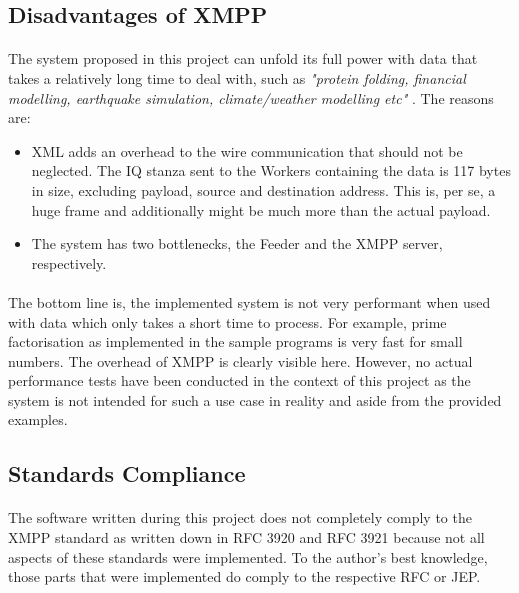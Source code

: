 \subsection{Disadvantages of XMPP}
\paragraph{}
The system proposed in this project can unfold its full power with data that takes a relatively long time to deal with, such as \textit{"protein folding, financial modelling, earthquake simulation, climate/weather modelling etc"} \cite{wikipedia005}. The reasons are:
\begin{itemize}
\item XML adds an overhead to the wire communication that should not be neglected. The IQ stanza sent to the Workers containing the data is 117 bytes in size, excluding payload, source and destination address. This is, per se, a huge frame and additionally might be much more than the actual payload.
\item The system has two bottlenecks, the Feeder and the XMPP server, respectively.
\end{itemize}

\paragraph{}
The bottom line is, the implemented system is not very performant when used with data which only takes a short time to process. For example, prime factorisation as implemented in the sample programs is very fast for small numbers. The overhead of XMPP is clearly visible here. However, no actual performance tests have been conducted in the context of this project as the system is not intended for such a use case in reality and aside from the provided examples.

\subsection{Standards Compliance}
\paragraph{}
The software written during this project does not completely comply to the XMPP standard as written down in RFC 3920 and RFC 3921 because not all aspects of these standards were implemented. To the author's best knowledge, those parts that were implemented do comply to the respective RFC or JEP.
